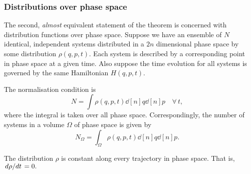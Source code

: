 \documentclass{article}
\begin{document}
\subsubsection{Distributions over phase space}
The second, \textit{almost} equivalent statement of the theorem is concerned with distribution functions over phase space. Suppose we have an ensemble of $ N $ identical, independent systems distributed in a $ 2n $ dimensional phase space by some distribution $ \rho(q,p,t) $. Each system is described by a corresponding point in phase space at a given time. Also suppose the time evolution for all systems is governed by the same Hamiltonian $ H(q,p,t) $.
\par
The normalisation condition is
\begin{equation}
	N = \int \rho(q,p,t) \dd[n]{q} \dd[n]{p} \quad \forall \, t ,
\end{equation}
where the integral is taken over all phase space. Correspondingly, the number of systems in a volume $ \Omega $ of phase space is given by
\begin{equation} \label{eq:326}
	N_{\Omega} = \int_{\Omega} \rho(q,p,t) \dd[n]{q} \dd[n]{p}.
\end{equation}
\begin{theorem}[Liouville 2]
	The distribution $ \rho $ is constant along every trajectory in phase space. That is, $ \dv*{\rho}{t} = 0. $
\end{theorem}
\end{document}
